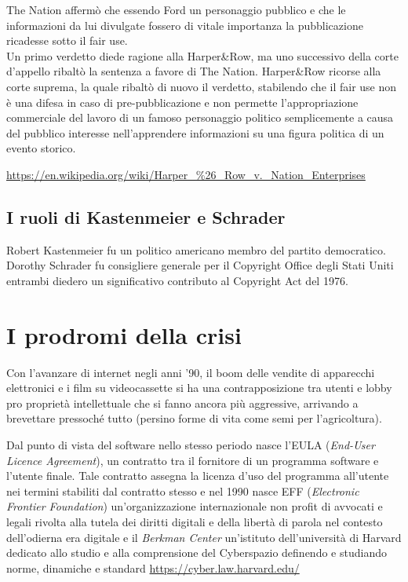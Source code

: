 The Nation affermò che essendo Ford un personaggio pubblico e che le informazioni da lui divulgate fossero di vitale importanza la pubblicazione ricadesse sotto il fair use.\\

Un primo verdetto diede ragione alla Harper\&Row, ma uno successivo
della corte d'appello ribaltò la sentenza a favore di The Nation. Harper\&Row ricorse alla corte suprema, la quale ribaltò di nuovo il
verdetto, stabilendo che il fair use non è una difesa in caso di  
pre-pubblicazione e non permette l'appropriazione commerciale del 
lavoro di un famoso personaggio politico semplicemente 
a causa del pubblico interesse nell'apprendere informazioni su una
figura politica di un evento storico.\\

\begin{sloppypar}
\url{https://en.wikipedia.org/wiki/Harper_%26_Row_v._Nation_Enterprises}
\end{sloppypar}

\subsection{I ruoli di Kastenmeier e Schrader}

Robert Kastenmeier fu un politico americano membro del partito democratico. 
Dorothy Schrader fu consigliere generale per il Copyright Office degli Stati Uniti entrambi diedero un significativo contributo al Copyright Act del 1976.

\section{I prodromi della crisi}

Con l'avanzare di internet negli anni '90, il boom delle vendite di apparecchi elettronici e i film su videocassette si ha una contrapposizione tra utenti e lobby pro proprietà intellettuale che si fanno ancora più aggressive, arrivando a brevettare pressoché tutto (persino forme di vita come semi per l'agricoltura).

Dal punto di vista del software nello stesso periodo nasce l'EULA (\textit{End-User Licence Agreement}), un contratto tra il fornitore di un programma software e l'utente finale. Tale contratto assegna la licenza d'uso del programma all'utente nei termini stabiliti dal contratto stesso e nel 1990 nasce EFF (\textit{Electronic Frontier Foundation}) un'organizzazione internazionale non profit di avvocati e legali rivolta alla tutela dei diritti digitali e della libertà di parola nel contesto dell'odierna era digitale e il \textit{Berkman Center} un'istituto dell'università di Harvard dedicato allo studio e alla comprensione del Cyberspazio definendo e studiando norme, dinamiche e standard \url{https://cyber.law.harvard.edu/}

